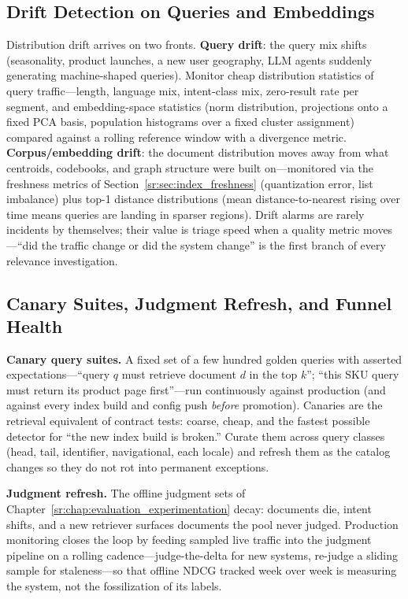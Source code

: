 \subsection{Drift Detection on Queries and Embeddings}

Distribution drift arrives on two fronts. \textbf{Query drift}: the query mix shifts (seasonality, product launches, a new user geography, LLM agents suddenly generating machine-shaped queries). Monitor cheap distribution statistics of query traffic---length, language mix, intent-class mix, zero-result rate per segment, and embedding-space statistics (norm distribution, projections onto a fixed PCA basis, population histograms over a fixed cluster assignment) compared against a rolling reference window with a divergence metric. \textbf{Corpus/embedding drift}: the document distribution moves away from what centroids, codebooks, and graph structure were built on---monitored via the freshness metrics of Section~\ref{sr:sec:index_freshness} (quantization error, list imbalance) plus top-1 distance distributions (mean distance-to-nearest rising over time means queries are landing in sparser regions). Drift alarms are rarely incidents by themselves; their value is triage speed when a quality metric moves---``did the traffic change or did the system change'' is the first branch of every relevance investigation.

\subsection{Canary Suites, Judgment Refresh, and Funnel Health}

\textbf{Canary query suites.} A fixed set of a few hundred golden queries with asserted expectations---``query $q$ must retrieve document $d$ in the top $k$''; ``this SKU query must return its product page first''---run continuously against production (and against every index build and config push \textit{before} promotion). Canaries are the retrieval equivalent of contract tests: coarse, cheap, and the fastest possible detector for ``the new index build is broken.'' Curate them across query classes (head, tail, identifier, navigational, each locale) and refresh them as the catalog changes so they do not rot into permanent exceptions.

\textbf{Judgment refresh.} The offline judgment sets of Chapter~\ref{sr:chap:evaluation_experimentation} decay: documents die, intent shifts, and a new retriever surfaces documents the pool never judged. Production monitoring closes the loop by feeding sampled live traffic into the judgment pipeline on a rolling cadence---judge-the-delta for new systems, re-judge a sliding sample for staleness---so that offline NDCG tracked week over week is measuring the system, not the fossilization of its labels.

